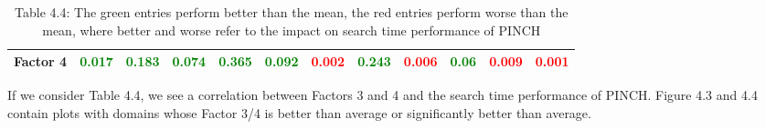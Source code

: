 \begin{table}[h]
\begin{longtable}[c]{| c | c | c | c | c | c | c | c | c | c | c | c |}
     {\small Factor 4} & 
     \textcolor{green}{{\footnotesize 0.017}} & \textcolor{green}{{\footnotesize 0.183}} & \textcolor{green}{{\footnotesize 0.074}} & \textcolor{green}{{\footnotesize 0.365}} & \textcolor{green}{{\footnotesize 0.092}} & \textcolor{red}{{\footnotesize 0.002}} & \textcolor{green}{{\footnotesize 0.243}} & \textcolor{red}{{\footnotesize 0.006}} & \textcolor{green}{{\footnotesize 0.06}} & \textcolor{red}{{\footnotesize 0.009}} & \textcolor{red}{{\footnotesize 0.001}}\\
     \hline
\end{longtable}

\caption*{ Table 4.4: The green entries perform better than the mean, the red entries perform worse than the mean, where better and worse refer to the impact on search time performance of PINCH }
\end{table} 
If we consider Table 4.4, we see a correlation between Factors 3 and 4 and the search time performance of PINCH. Figure 4.3 and 4.4 contain plots with domains whose Factor 3/4 is better than average or significantly better than average.\\

